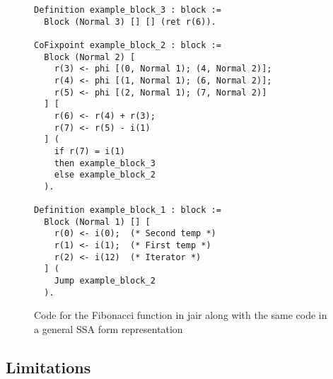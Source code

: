 \begin{figure}[ht]
\centering
\begin{minipage}{0.65\textwidth}
\begin{lstlisting}[style=Rocq]
Definition example_block_3 : block :=
  Block (Normal 3) [] [] (ret r(6)).

CoFixpoint example_block_2 : block :=
  Block (Normal 2) [
    r(3) <- phi [(0, Normal 1); (4, Normal 2)];
    r(4) <- phi [(1, Normal 1); (6, Normal 2)];
    r(5) <- phi [(2, Normal 1); (7, Normal 2)]
  ] [
    r(6) <- r(4) + r(3);
    r(7) <- r(5) - i(1)
  ] (
    if r(7) = i(1)
    then example_block_3
    else example_block_2
  ).

Definition example_block_1 : block :=
  Block (Normal 1) [] [
    r(0) <- i(0);  (* Second temp *)
    r(1) <- i(1);  (* First temp *)
    r(2) <- i(12)  (* Iterator *)
  ] (
    Jump example_block_2
  ).
\end{lstlisting}
\end{minipage}
\hfill
\begin{minipage}{0.30\textwidth}
\centering
{}
\end{minipage}
\caption{Code for the Fibonacci function in \gls{jair} along with the same code in a general SSA form representation}
\label{fig:example-jair}
\end{figure}

\subsection{Limitations}
\label{subsec:limitations}

